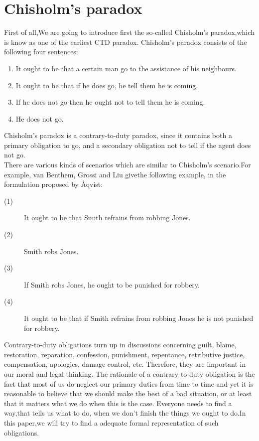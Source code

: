 \documentclass{article}
\begin{document}
\section{ Chisholm's paradox}
First of all,We are going to introduce first the so-called Chisholm's paradox\cite{2},which is know as one of the earliest CTD paradox.
Chisholm's paradox consists of the following four sentences:
\begin{enumerate}
\item  It ought to be that a certain man go to the assistance of his neighbours.
\item  It ought to be that if he does go, he tell them he is coming.
\item If he does not go then he ought not to tell them he is coming.
\item He does not go.
\end{enumerate}
Chisholm’s paradox is a contrary-to-duty paradox, since it contains both a primary obligation to go, and a secondary obligation not to tell if the agent does not go.\\
There are various kinds of scenarios which are similar to Chisholm’s scenario.For example, van Benthem, Grossi and Liu \cite{3} givethe following example, in the formulation proposed by Åqvist:\\
\begin{description}
\item[(1)] It ought to be that Smith refrains from robbing Jones.
\item[(2)] Smith robs Jones.
\item[(3)]If Smith robs Jones, he ought to be punished for robbery.
\item[(4)]It ought to be that if Smith refrains from robbing Jones he is not punished
for robbery.
\end{description}



Contrary-to-duty obligations turn up in discussions concerning guilt, blame, restoration, reparation, confession, punishment, repentance, retributive justice, compensation, apologies, damage control, etc. Therefore, they are important in our moral and legal thinking. The rationale of a contrary-to-duty obligation is the fact that most of us do neglect our primary duties from time to time and yet it is reasonable to believe that we should make the best of a bad situation, or at least that it matters what we do when this is the case. Everyone needs to find a way,that tells us what to do, when we don't finish the things we ought to do.In this paper,we will try to find a adequate formal representation of such obligations.
\end{document}
